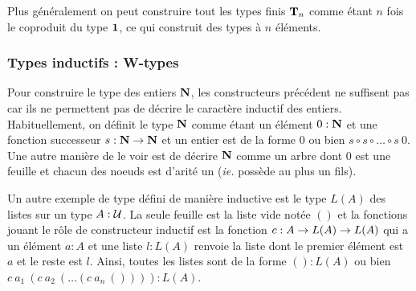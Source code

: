 \documentclass[../../rapport.tex]{subfiles}
\begin{document}
  Plus généralement on peut construire tout les types finis $\mathbf T_n$ comme étant $n$ fois le coproduit du type $\operatorname{\textbf{1}}$,
  ce qui construit des types à $n$ éléments.

  \subsubsection{Types inductifs : W-types}

  Pour construire le type des entiers $\mathbf N$, les constructeurs précédent ne suffisent pas car ils ne permettent
  pas de décrire le caractère inductif des entiers.
  Habituellement, on définit le type $\mathbf N$ comme étant un élément $0 : \mathbf N$ et une fonction successeur
  $s : \mathbf N \rightarrow \mathbf N$ et un entier est de la forme $0$ ou bien $s\circ s \circ \hdots \circ s\ 0$.
  Une autre manière de le voir est de décrire $\mathbf N$ comme un arbre dont $0$ est une feuille et
  chacun des noeuds est d'arité un (\textit{ie.} possède au plus un fils).

  \begin{figure}[ht]
    \centering
  \end{figure}

  Un autre exemple de type défini de manière inductive est le type $L(A)$ des listes sur un type $A : \mathcal U$.
  La seule feuille est la liste vide notée $()$ et la fonctions jouant le rôle de constructeur inductif est
  la fonction $c : A \rightarrow L(A) \rightarrow L(A)$ qui a un élément $a : A$ et une liste $l : L(A)$ renvoie la liste
  dont le premier élément est $a$ et le reste est $l$.
  Ainsi, toutes les listes sont de la forme $() : L(A)$ ou bien $c\ a_1\ (c\ a_2\ (\hdots (c\ a_n\ ()))) :L(A)$.

  \begin{figure}[ht]
    \centering
  \end{figure}
\end{document}
